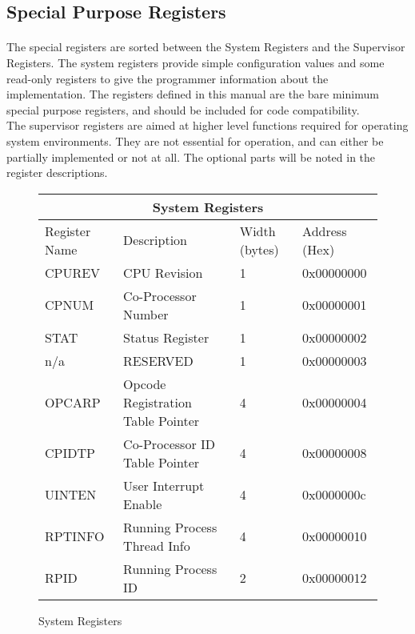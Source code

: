 \documentclass[letterpaper, 11pt]{article}
\begin{document}
\clearpage


\subsection{Special Purpose Registers}
\paragraph{}The special registers are sorted between the System Registers and the Supervisor Registers. The system registers provide
simple configuration values and some read-only registers to give the programmer information about the implementation.
The registers defined in this manual are the bare minimum special purpose registers, and
should be included for code compatibility. \\
The supervisor registers are aimed at higher level functions required for operating system environments. They are not essential for operation,
and can either be partially implemented or not at all. The optional parts will be noted in the register descriptions.\\

\begin{figure}[!h]
	
	\caption{System Registers}
	\begin{center}
		\fontsize{10}{12}\selectfont
		\begin{tabular}{|l|l|l|l|}
			\hline
			\multicolumn{4}{|c|}{System Registers} \\
			\hline
			Register Name 	& Description 				 		& Width (bytes) 	& Address (Hex) \\ \hline
			CPUREV  		& CPU Revision 				 		& 	1				& 0x00000000 	\\ \hline
			CPNUM			& Co-Processor Number		 		&	1				& 0x00000001 	\\ \hline
			STAT			& Status Register			 		&	1				& 0x00000002 	\\ \hline
			n/a				& RESERVED				 	 		&	1				& 0x00000003 	\\ \hline
			OPCARP			& Opcode Registration Table Pointer	&	4				& 0x00000004 	\\ \hline
			CPIDTP 			& Co-Processor ID Table Pointer 	& 	4				& 0x00000008 	\\ \hline
			UINTEN			& User Interrupt Enable				&	4				& 0x0000000c	\\ \hline
			RPTINFO			& Running Process Thread Info		&	4				& 0x00000010 	\\ \hline
			RPID			& Running Process ID				&	2				&	0x00000012  \\ \hline

			
		\end{tabular}
	\end{center}
\end{figure}
\end{document}
